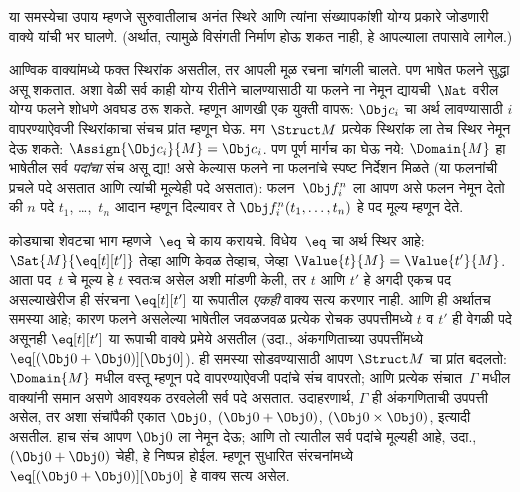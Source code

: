 या समस्येचा उपाय म्हणजे सुरुवातीलाच अनंत स्थिरे आणि त्यांना संख्यापकांशी
योग्य प्रकारे जोडणारी वाक्ये यांची भर घालणे. (अर्थात, त्यामुळे विसंगती
निर्माण होऊ शकत नाही, हे आपल्याला तपासावे लागेल.)

आण्विक वाक्यांमध्ये फक्त स्थिरांक असतील, तर आपली मूळ रचना चांगली
चालते. पण भाषेत फलने सुद्धा असू शकतात. अशा वेळी सर्व काही योग्य
रीतीने चालण्यासाठी या फलने ना नेमून द्यायची~$\Nat$ वरील योग्य
फलने शोधणे अवघड ठरू शकते. म्हणून आणखी एक युक्ती वापरू: $\Obj c_i$ चा
अर्थ लावण्यासाठी $i$ वापरण्याऐवजी स्थिरांकाचा संचच प्रांत म्हणून
घेऊ. मग $\Struct M$ प्रत्येक स्थिरांक ला तेच स्थिर नेमून देऊ शकते:
$\Assign{\Obj c_i}{M} = \Obj c_i$. पण पूर्ण मार्गच का घेऊ नये:
$\Domain{M}$ हा भाषेतील सर्व \emph{पदांचा} संच असू द्या!{} असे केल्यास
फलने ना फलनांचे स्पष्ट निर्देशन मिळते (या फलनांची प्रचले पदे असतात
आणि त्यांची मूल्येही पदे असतात): फलन~$\Obj f^n_i$ ला आपण असे
फलन नेमून देतो की $n$ पदे $t_1$, \dots,~$t_n$ आदान म्हणून दिल्यावर ते
$\Obj f^n_i(t_1, \dots, t_n)$ हे पद मूल्य म्हणून देते.

कोड्याचा शेवटचा भाग म्हणजे~$\eq$ चे काय करायचे. विधेय~$\eq$ चा
अर्थ स्थिर आहे: $\Sat{M}{\eq[t][t']}$ तेव्हा आणि केवळ तेव्हाच, जेव्हा
$\Value{t}{M} = \Value{t'}{M}$. आता पद~$t$ चे मूल्य हे $t$ स्वतःच
असेल अशी मांडणी केली, तर $t$ आणि $t'$ हे अगदी एकच पद असल्याखेरीज ही
संरचना $\eq[t][t']$ या रूपातील \emph{एकही} वाक्य सत्य करणार नाही.
आणि ही अर्थातच समस्या आहे; कारण फलने असलेल्या भाषेतील जवळजवळ
प्रत्येक रोचक उपपत्तीमध्ये $t$ व $t'$ ही वेगळी पदे असूनही $\eq[t][t']$
या रूपाची वाक्ये प्रमेये असतील (उदा., अंकगणिताच्या उपपत्तींमध्ये
$\eq[(\Obj 0+ \Obj 0)][\Obj 0]$). ही समस्या सोडवण्यासाठी आपण
$\Struct M$ चा प्रांत बदलतो: $\Domain{M}$ मधील वस्तू म्हणून पदे वापरण्याऐवजी
पदांचे संच वापरतो; आणि प्रत्येक संचात~$\Gamma$ मधील वाक्यांनी समान असणे
आवश्यक ठरवलेली सर्व पदे असतात. उदाहरणार्थ, $\Gamma$ ही अंकगणिताची उपपत्ती
असेल, तर अशा संचांपैकी एकात $\Obj 0$, $(\Obj 0 + \Obj 0)$, $(\Obj
0 \times \Obj 0)$, इत्यादी असतील. हाच संच आपण $\Obj 0$ ला नेमून देऊ;
आणि तो त्यातील सर्व पदांचे मूल्यही आहे, उदा., $(\Obj 0 + \Obj 0)$ चेही,
हे निष्पन्न होईल. म्हणून सुधारित संरचनांमध्ये
$\eq[(\Obj 0+ \Obj 0)][\Obj 0]$ हे वाक्य सत्य असेल.

